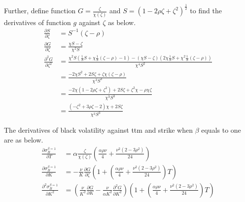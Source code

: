 \documentclass{article}
\begin{document}
Further, define function $ G = \frac{\zeta}{\chi\left(\zeta\right)} $ and $ S = \left(1 - 2 \rho \zeta + \zeta^2\right)^{\frac{1}{2}} $ to find the derivatives of function $ g $ against $ \zeta $ as below.
\begin{subequations}
    \begin{align}
        \frac{\partial S}{\partial \zeta} &= S^{-1} \left(\zeta - \rho\right) \\
        \frac{\partial G}{\partial \zeta} &= \frac{\chi S - \zeta}{\chi^2 S} \\
        \frac{\partial^2 G}{\partial \zeta^2} &= \frac{\chi^2 S \left(\frac{1}{S} S + \chi \frac{1}{S} \left(\zeta - \rho\right) - 1\right) - \left(\chi S - \zeta\right) \left(2 \chi \frac{1}{S} S + \chi^2 \frac{1}{S} \left(\zeta - \rho\right)\right)}{\chi^4 S^2} \nonumber \\
        &= \frac{-2 \chi S^2 + 2 S \zeta + \zeta \chi \left(\zeta - \rho\right)}{\chi^3 S^3} \nonumber \\
        &= \frac{-2 \chi \left(1 - 2\rho \zeta + \zeta^2\right) + 2 S \zeta + \zeta^2 \chi - \rho \chi \zeta}{\chi^3 S^3} \nonumber \\
        &= \frac{\left(-\zeta^2 + 3 \rho \zeta - 2\right) \chi + 2 S \zeta}{\chi^3 S^3}
    \end{align}
\end{subequations}

The derivatives of black volatility against ttm and strike when $ \beta $ equals to one are as below.
\begin{subequations}
    \begin{align}
        \frac{\partial \sigma_{B}^{\beta=1}}{\partial T} &= \alpha \frac{\zeta}{\chi \left(\zeta\right)} \left(\frac{\alpha \rho \nu}{4} + \frac{\nu^2 \left(2 - 3 \rho^2\right)}{24}\right) \label{dSigdT} \\
        \frac{\partial \sigma_{B}^{\beta=1}}{\partial K} &= -\frac{\nu}{K} \frac{\partial G}{\partial \zeta} \left(1 + \left(\frac{\alpha \rho \nu}{4} + \frac{\nu^2 \left(2 - 3 \rho^2\right)}{24}\right) T\right) \label{dSigdK} \\
        \frac{\partial^2 \sigma_{B}^{\beta=1}}{\partial K^2} &= \left(\frac{\nu}{K^2} \frac{\partial G}{\partial K} - \frac{\nu}{\alpha K^2} \frac{\partial^2 G}{\partial K^2}\right) \left(1 + \left(\frac{\alpha \rho \nu}{4} + \frac{\nu^2 \left(2 - 3 \rho^2\right)}{24}\right) T\right) \label{dSig2dK2}
    \end{align}
\end{subequations}
\end{document}
